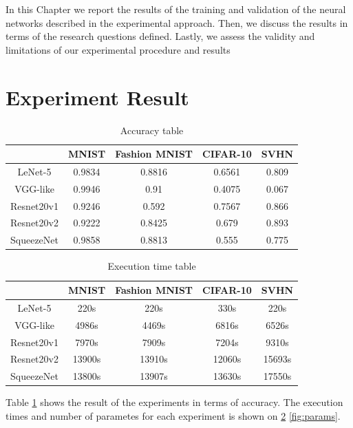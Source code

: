 In this Chapter we report the results of the training and validation of the neural networks described in the experimental approach. Then, we discuss the results in terms of the research questions defined. Lastly, we assess the validity and limitations of our experimental procedure and results

\section{Experiment Result}
\begin{table}	
	\centering
	\begin{tabular}{ |c|c|c|c|c| } 
		\hline
		& MNIST & Fashion MNIST & CIFAR-10 & SVHN \\ 
		\hline
		LeNet-5	& 0.9834 & 0.8816 & 0.6561 & 0.809\\
		\hline 
		VGG-like & 0.9946 & 0.91 & 0.4075 & 0.067\\ 
		\hline
		Resnet20v1 & 0.9246 & 0.592 & 0.7567 & 0.866\\ 
		\hline
		Resnet20v2 & 0.9222 & 0.8425 & 0.679 & 0.893\\
		\hline
		SqueezeNet & 0.9858 & 0.8813 & 0.555 & 0.775\\
		\hline
	\end{tabular}
	\label{tab:accuracy}
	\caption{Accuracy table}
\end{table}

\begin{table}
	\centering
	\begin{tabular}{ |c|c|c|c|c| } 
		\hline
		& MNIST & Fashion MNIST & CIFAR-10 & SVHN \\ 
		\hline
		LeNet-5	& 220s & 220s & 330s & 220s\\
		\hline 
		VGG-like & 4986s	& 4469s & 6816s & 6526s\\ 
		\hline
		Resnet20v1 & 7970s & 7909s	& 7204s & 9310s\\ 
		\hline
		Resnet20v2 & 13900s & 	13910s & 	12060s & 	15693s\\
		\hline
		SqueezeNet & 13800s & 	13907s & 	13630s & 	17550s\\
		\hline
	\end{tabular}
	\label{tab:times}
	\caption{Execution time table}
\end{table}
Table \ref{tab:accuracy} shows the result of the experiments in terms of accuracy. The execution times and number of parametes for each experiment is shown on \ref{tab:times} \ref{fig:params}.




